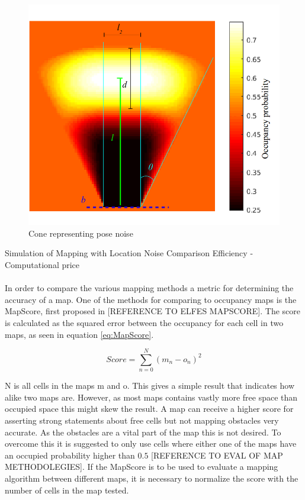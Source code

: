 \begin{figure}
	\centering
			\includegraphics[width=\textwidth]{figures/static_mapping/cone_noise_top}
			\caption{Cone representing pose noise}
			\label{fig:cone_with_noise_top}

\end{figure}

Simulation of Mapping with Location Noise
Comparison
Efficiency - Computational price\\ 
 \\

In order to compare the various mapping methods a metric for determining the accuracy of a map. One of the methods for comparing to occupancy maps is the MapScore, first proposed in [REFERENCE TO ELFES MAPSCORE]. The score is calculated as the squared error between the occupancy for each cell in two maps, as seen in equation \ref{eq:MapScore}.

\begin{equation}
\label{eq:MapScore}
Score = \sum_{n=0}^{N} (m_{n} - o_{n})^2
\end{equation}

N is all cells in the maps m and o. This gives a simple result that indicates how alike two maps are. However, as most maps contains vastly more free space than occupied space this might skew the result. A map can receive a higher score for asserting strong statements about free cells but not mapping obstacles very accurate. As the obstacles are a vital part of the map this is not desired. To overcome this it is suggested to only use cells where either one of the maps have an occupied probability higher than \(0.5\) [REFERENCE TO EVAL OF MAP METHODOLEGIES]. If the MapScore is to be used to evaluate a mapping algorithm between different maps, it is necessary to normalize the score with the number of cells in the map tested. 

